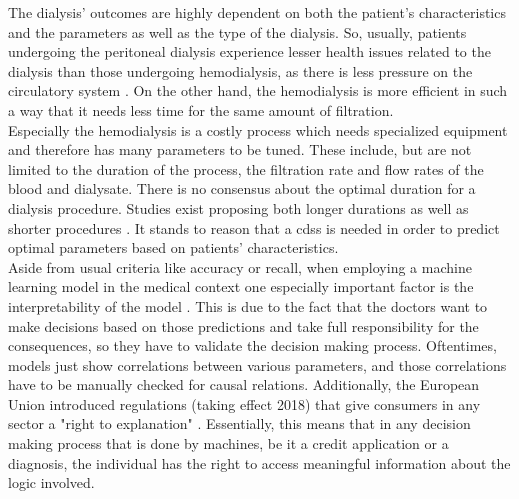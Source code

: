 \documentclass[conference,comsoc]{IEEEtran}
\begin{document}
The dialysis’ outcomes are highly dependent on both the patient’s characteristics and the parameters as well as the type of the dialysis. 
So, usually, patients undergoing the peritoneal dialysis experience lesser health issues related to the dialysis than those undergoing hemodialysis, as there is less pressure on the circulatory system \cite{Fenton1997}.
On the other hand, the hemodialysis is more efficient in such a way that it needs less time for the same amount of filtration. \\
Especially the hemodialysis is a costly process which needs specialized equipment and therefore has many parameters to be tuned. 
These include, but are not limited to the duration of the process, the filtration rate and flow rates of the blood and dialysate.
There is no consensus about the optimal duration for a dialysis procedure.
Studies exist proposing both longer durations \cite{jungers2001longer} as well as shorter procedures \cite{ronco1988technical}.
It stands to reason that a \gls{cdss} is needed in order to predict optimal parameters based on patients' characteristics. \\

Aside from usual criteria like accuracy or recall, when employing a machine learning model in the medical context one especially important factor is the interpretability of the model \cite{Katuwal2016}.
This is due to the fact that the doctors want to make decisions based on those predictions and take full responsibility for the consequences, so they have to validate the decision making process.
Oftentimes, models just show correlations between various parameters, and those correlations have to be manually checked for causal relations.
Additionally, the European Union introduced regulations (taking effect 2018) that give consumers in any sector a "right to explanation" \cite{goodman2016european}.
Essentially, this means that in any decision making process that is done by machines, be it a credit application or a diagnosis, the individual has the right to access meaningful information about the logic involved. \\
\end{document}
